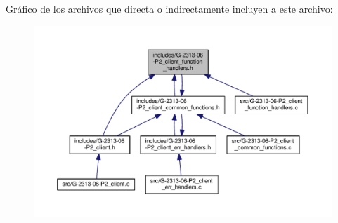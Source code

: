 Gráfico de los archivos que directa o indirectamente incluyen a este archivo\+:\nopagebreak
\begin{figure}[H]
\begin{center}
\leavevmode
\includegraphics[width=350pt]{G-2313-06-P2__client__function__handlers_8h__dep__incl}
\end{center}
\end{figure}
